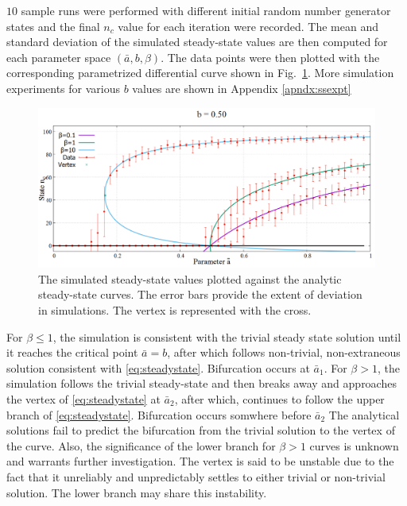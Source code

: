 $10$ sample runs were performed with different initial random number generator states and the final $n_{c}$ value for each iteration were recorded.
The mean and standard deviation of the simulated steady-state values are then computed for each parameter space $(\bar{a},b,\beta)$. 
The data points were then plotted with the corresponding parametrized differential curve shown in Fig.~\ref{fig:phase+sim}.
More simulation experiments for various $b$ values are shown in Appendix \ref{apndx:ssexpt}

\begin{figure}[h!]
 \centering
  \includegraphics[width=\linewidth]{images/chapter3/phase+sim.png}
  \caption{The simulated steady-state values plotted against the analytic steady-state curves. The error bars provide the extent of deviation in simulations. The vertex is represented with the cross.}
  \label{fig:phase+sim}
\end{figure}

For $\beta \leq 1$, the simulation is consistent with the trivial steady state solution until it reaches the critical point $\bar{a} = b$, after which follows non-trivial, non-extraneous solution consistent with \eqref{eq:steadystate}.
Bifurcation occurs at $\bar{a}_1$.
For $\beta > 1$, the simulation follows the trivial steady-state and then breaks away and approaches the vertex of \eqref{eq:steadystate} at $\bar{a}_{2}$, after which, continues to follow the upper branch of \eqref{eq:steadystate}.
Bifurcation occurs somwhere before $\bar{a}_2$
The analytical solutions fail to predict the bifurcation from the trivial solution to the vertex of the curve.
Also, the significance of the lower branch for $\beta > 1$ curves is unknown and warrants further investigation.
The vertex is said to be unstable due to the fact that it unreliably and unpredictably settles to either trivial or non-trivial solution.
The lower branch may share this instability.    

